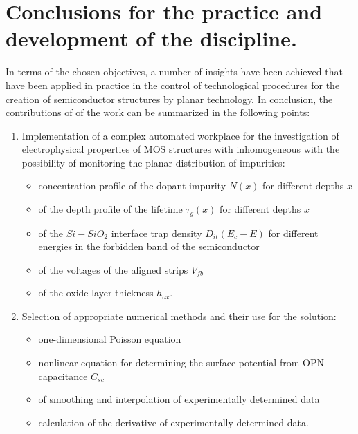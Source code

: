 \chapter{Conclusions for the practice and development of the discipline.}\label{Chapter9}

In terms of the chosen objectives, a number of insights have been
achieved that have been applied in practice in the control of
technological procedures for the creation of semiconductor structures
by planar technology. In conclusion, the contributions of of the work
can be summarized in the following points:

\begin{enumerate}

\item Implementation of a complex automated workplace for the
  investigation of electrophysical properties of MOS structures with
  inhomogeneous with the possibility of monitoring the planar
  distribution of impurities:

  \begin{itemize}
  \item concentration profile of the dopant impurity $N(x)$ for
    different depths $x$
  \item of the depth profile of the lifetime $\tau_{g}(x)$ for
    different depths $x$
  \item of the $Si-SiO_{2}$ interface trap density $D_{it}(E_{c}-E)$
    for different energies in the forbidden band of the semiconductor
  \item of the voltages of the aligned strips $V_{fb}$
  \item of the oxide layer thickness $h_{ox}$.
  \end{itemize}

\item Selection of appropriate numerical methods and their use for the
  solution:

  \begin{itemize}
  \item one-dimensional Poisson equation
  \item nonlinear equation for determining the surface potential from
    OPN capacitance $C_{sc}$
  \item of smoothing and interpolation of experimentally determined data
  \item calculation of the derivative of experimentally determined data.
  \end{itemize}


\end{enumerate}
